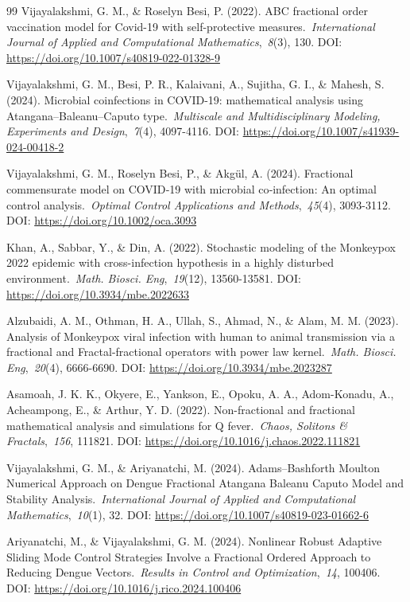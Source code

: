 \documentclass[10pt]{NSP1}
\begin{document}
\begin{thebibliography}{99}
Vijayalakshmi, G. M., \& Roselyn Besi, P. (2022). ABC fractional order vaccination model for Covid-19 with self-protective measures.~\emph{International Journal of Applied and Computational Mathematics},~\emph{8}(3), 130. DOI: \url{https://doi.org/10.1007/s40819-022-01328-9}

Vijayalakshmi, G. M., Besi, P. R., Kalaivani, A., Sujitha, G. I., \& Mahesh, S. (2024). Microbial coinfections in COVID-19: mathematical analysis using Atangana--Baleanu--Caputo type.~\emph{Multiscale and Multidisciplinary Modeling, Experiments and Design},~\emph{7}(4), 4097-4116. DOI: \url{https://doi.org/10.1007/s41939-024-00418-2}

Vijayalakshmi, G. M., Roselyn Besi, P., \& Akgül, A. (2024). Fractional commensurate model on COVID‐19 with microbial co‐infection: An optimal control analysis.~\emph{Optimal Control Applications and Methods},~\emph{45}(4), 3093-3112. DOI: \url{https://doi.org/10.1002/oca.3093}

Khan, A., Sabbar, Y., \& Din, A. (2022). Stochastic modeling of the Monkeypox 2022 epidemic with cross-infection hypothesis in a highly disturbed environment.~\emph{Math. Biosci. Eng},~\emph{19}(12), 13560-13581. DOI: \url{https://doi.org/10.3934/mbe.2022633}

Alzubaidi, A. M., Othman, H. A., Ullah, S., Ahmad, N., \& Alam, M. M. (2023). Analysis of Monkeypox viral infection with human to animal transmission via a fractional and Fractal-fractional operators with power law kernel.~\emph{Math. Biosci. Eng},~\emph{20}(4), 6666-6690. DOI: \url{https://doi.org/10.3934/mbe.2023287}

Asamoah, J. K. K., Okyere, E., Yankson, E., Opoku, A. A., Adom-Konadu, A., Acheampong, E., \& Arthur, Y. D. (2022). Non-fractional and fractional mathematical analysis and simulations for Q fever.~\emph{Chaos, Solitons \& Fractals},~\emph{156}, 111821. DOI: \url{https://doi.org/10.1016/j.chaos.2022.111821}

Vijayalakshmi, G. M., \& Ariyanatchi, M. (2024). Adams--Bashforth Moulton Numerical Approach on Dengue Fractional Atangana Baleanu Caputo Model and Stability Analysis.~\emph{International Journal of Applied and Computational Mathematics},~\emph{10}(1), 32. DOI: \url{https://doi.org/10.1007/s40819-023-01662-6}

Ariyanatchi, M., \& Vijayalakshmi, G. M. (2024). Nonlinear Robust Adaptive Sliding Mode Control Strategies Involve a Fractional Ordered Approach to Reducing Dengue Vectors.~\emph{Results in Control and Optimization},~\emph{14}, 100406. DOI: \url{https://doi.org/10.1016/j.rico.2024.100406}


\end{thebibliography}
\end{document}

